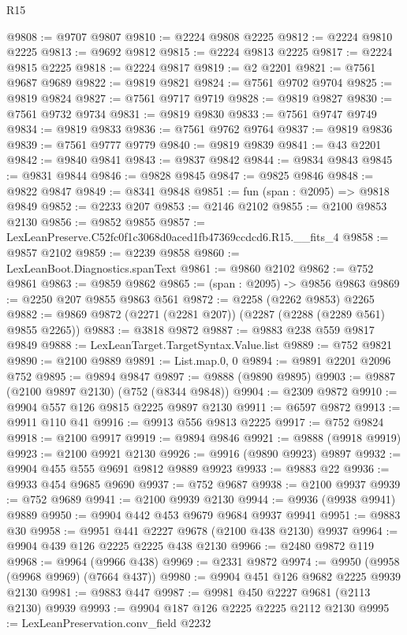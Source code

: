 \begin{lexlean}{R15}
\begin{coremodule}
@9808 := @9707 @9807
@9810 := @2224 @9808 @2225
@9812 := @2224 @9810 @2225
@9813 := @9692 @9812
@9815 := @2224 @9813 @2225
@9817 := @2224 @9815 @2225
@9818 := @2224 @9817
@9819 := @2 @2201
@9821 := @7561 @9687 @9689
@9822 := @9819 @9821
@9824 := @7561 @9702 @9704
@9825 := @9819 @9824
@9827 := @7561 @9717 @9719
@9828 := @9819 @9827
@9830 := @7561 @9732 @9734
@9831 := @9819 @9830
@9833 := @7561 @9747 @9749
@9834 := @9819 @9833
@9836 := @7561 @9762 @9764
@9837 := @9819 @9836
@9839 := @7561 @9777 @9779
@9840 := @9819 @9839
@9841 := @43 @2201
@9842 := @9840 @9841
@9843 := @9837 @9842
@9844 := @9834 @9843
@9845 := @9831 @9844
@9846 := @9828 @9845
@9847 := @9825 @9846
@9848 := @9822 @9847
@9849 := @8341 @9848
@9851 := fun (span : @2095) => @9818 @9849
@9852 := @2233 @207
@9853 := @2146 @2102
@9855 := @2100 @9853 @2130
@9856 := @9852 @9855
@9857 := LexLeanPreserve.C52fc0f1c3068d0aced1fb47369ccdcd6.R15.__fits_4
@9858 := @9857 @2102
@9859 := @2239 @9858
@9860 := LexLeanBoot.Diagnostics.spanText
@9861 := @9860 @2102
@9862 := @752 @9861
@9863 := @9859 @9862
@9865 := (span : @2095) -> @9856 @9863
@9869 := @2250 @207 @9855 @9863 @561
@9872 := @2258 (@2262 @9853) @2265
@9882 := @9869 @9872 (@2271 (@2281 @207)) (@2287 (@2288 (@2289 @561) @9855 @2265))
@9883 := @3818 @9872
@9887 := @9883 @238 @559 @9817 @9849
@9888 := LexLeanTarget.TargetSyntax.Value.list
@9889 := @752 @9821
@9890 := @2100 @9889
@9891 := List.map.{0, 0}
@9894 := @9891 @2201 @2096 @752
@9895 := @9894 @9847
@9897 := @9888 (@9890 @9895)
@9903 := @9887 (@2100 @9897 @2130) (@752 (@8344 @9848))
@9904 := @2309 @9872
@9910 := @9904 @557 @126 @9815 @2225 @9897 @2130
@9911 := @6597 @9872
@9913 := @9911 @110 @41
@9916 := @9913 @556 @9813 @2225
@9917 := @752 @9824
@9918 := @2100 @9917
@9919 := @9894 @9846
@9921 := @9888 (@9918 @9919)
@9923 := @2100 @9921 @2130
@9926 := @9916 (@9890 @9923) @9897
@9932 := @9904 @455 @555 @9691 @9812 @9889 @9923
@9933 := @9883 @22
@9936 := @9933 @454 @9685 @9690
@9937 := @752 @9687
@9938 := @2100 @9937
@9939 := @752 @9689
@9941 := @2100 @9939 @2130
@9944 := @9936 (@9938 @9941) @9889
@9950 := @9904 @442 @453 @9679 @9684 @9937 @9941
@9951 := @9883 @30
@9958 := @9951 @441 @2227 @9678 (@2100 @438 @2130) @9937
@9964 := @9904 @439 @126 @2225 @2225 @438 @2130
@9966 := @2480 @9872 @119
@9968 := @9964 (@9966 @438)
@9969 := @2331 @9872
@9974 := @9950 (@9958 (@9968 @9969) (@7664 @437))
@9980 := @9904 @451 @126 @9682 @2225 @9939 @2130
@9981 := @9883 @447
@9987 := @9981 @450 @2227 @9681 (@2113 @2130) @9939
@9993 := @9904 @187 @126 @2225 @2225 @2112 @2130
@9995 := LexLeanPreservation.conv_field @2232

\end{coremodule}
\end{lexlean}

